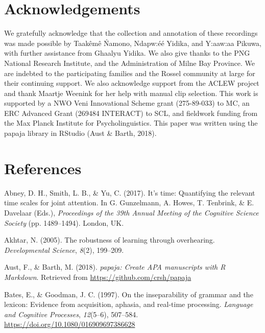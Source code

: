 \documentclass[
  english,
  ,man,floatsintext]{apa6}
\begin{document}
\hypertarget{acknowledgements}{%
\section{Acknowledgements}\label{acknowledgements}}

We gratefully acknowledge that the collection and annotation of these recordings was made possible by Taakêmê Ńamono, Ndapw:éé Yidika, and Y:aaw:aa Pikuwa, with further assistance from Ghaalyu Yidika. We also give thanks to the PNG National Research Institute, and the Administration of Milne Bay Province. We are indebted to the participating families and the Rossel community at large for their continuing support. We also acknowledge support from the ACLEW project and thank Maartje Weenink for her help with manual clip selection. This work is supported by a NWO Veni Innovational Scheme grant (275-89-033) to MC, an ERC Advanced Grant (269484 INTERACT) to SCL, and fieldwork funding from the Max Planck Institute for Psycholinguistics. This paper was written using the papaja library in RStudio (Aust \& Barth, 2018).

\newpage

\hypertarget{refs}{%
\section{References}\label{refs}}

\begingroup
\setlength{\parindent}{-0.5in}
\setlength{\leftskip}{0.5in}

\hypertarget{refs}{}
\leavevmode\hypertarget{ref-abney2017time}{}%
Abney, D. H., Smith, L. B., \& Yu, C. (2017). It's time: Quantifying the relevant time scales for joint attention. In G. Gunzelmann, A. Howes, T. Tenbrink, \& E. Davelaar (Eds.), \emph{Proceedings of the 39th Annual Meeting of the Cognitive Science Society} (pp. 1489--1494). London, UK.

\leavevmode\hypertarget{ref-akhtar2005robustness}{}%
Akhtar, N. (2005). The robustness of learning through overhearing. \emph{Developmental Science}, \emph{8}(2), 199--209.

\leavevmode\hypertarget{ref-R-papaja}{}%
Aust, F., \& Barth, M. (2018). \emph{papaja: Create APA manuscripts with R Markdown}. Retrieved from \url{https://github.com/crsh/papaja}

\leavevmode\hypertarget{ref-bates1997inseparability}{}%
Bates, E., \& Goodman, J. C. (1997). On the inseparability of grammar and the lexicon: Evidence from acquisition, aphasia, and real-time processing. \emph{Language and Cognitive Processes}, \emph{12}(5--6), 507--584. \url{https://doi.org/10.1080/016909697386628}
\end{document}
